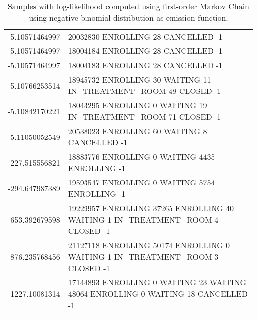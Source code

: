 {\begin{longtable}{|c|p{}|}
\hline
-5.10571464997 & 20032830 ENROLLING 28 CANCELLED -1 \\
-5.10571464997 & 18004184 ENROLLING 28 CANCELLED -1 \\
-5.10571464997 & 18004183 ENROLLING 28 CANCELLED -1 \\
-5.10766253514 & 18945732 ENROLLING 30 WAITING 11 IN\_TREATMENT\_ROOM 48 CLOSED -1 \\
-5.10842170221 & 18043295 ENROLLING 0 WAITING 19 IN\_TREATMENT\_ROOM 71 CLOSED -1 \\
-5.11050052549 & 20538023 ENROLLING 60 WAITING 8 CANCELLED -1 \\
\hline
-227.515556821 & 18883776 ENROLLING 0 WAITING 4435 ENROLLING -1 \\
-294.647987389 & 19593547 ENROLLING 0 WAITING 5754 ENROLLING -1 \\
-653.392679598 & 19229957 ENROLLING 37265 ENROLLING 40 WAITING 1 IN\_TREATMENT\_ROOM 4 CLOSED -1 \\
-876.235768456 & 21127118 ENROLLING 50174 ENROLLING 0 WAITING 1 IN\_TREATMENT\_ROOM 3 CLOSED -1 \\
-1227.10081314 & 17144893 ENROLLING 0 WAITING 23 WAITING 48064 ENROLLING 0 WAITING 18 CANCELLED -1 \\
\hline
\caption{Samples with log-likelihood computed using first-order Markov Chain using negative binomial distribution as emission function.}
\label{tab:samplesFromGenerative}
\end{longtable}
}
